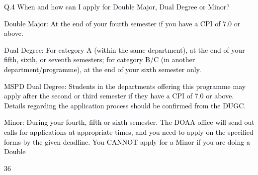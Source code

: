 \documentclass[12pt]{article}
\begin{document}
\vspace{\baselineskip}
{\fontsize{10pt}{12.0pt}\selectfont \textcolor[HTML]{00000A}{Q.4 When and how can I apply for Double Major, Dual Degree or Minor?}\par}\par


\vspace{\baselineskip}
{\fontsize{10pt}{12.0pt}\selectfont \textcolor[HTML]{00000A}{Double Major: At the end of your fourth semester if you have a CPI of 7.0 or above.}\par}\par


\vspace{\baselineskip}
\begin{justify}
{\fontsize{10pt}{12.0pt}\selectfont \textcolor[HTML]{00000A}{Dual Degree: For category A (within the same department), at the end of your fifth, sixth, or seventh semesters; for category B/C (in another department/programme), at the end of your sixth semester only.}\par}
\end{justify}\par


\vspace{\baselineskip}
\begin{justify}
{\fontsize{9pt}{10.8pt}\selectfont \textcolor[HTML]{00000A}{MSPD Dual Degree: Students in the departments offering this programme may apply after the second or third semester if they have a CPI of 7.0 or above. Details regarding the application process should be confirmed from the DUGC.}\par}
\end{justify}\par


\vspace{\baselineskip}
\begin{justify}
{\fontsize{9pt}{10.8pt}\selectfont \textcolor[HTML]{00000A}{Minor: During your fourth, fifth or sixth semester. The DOAA office will send out calls for applications at appropriate times, and you need to apply on the specified forms by the given deadline. You CANNOT apply for a Minor if you are doing a Double}\par}
\end{justify}\par

\begin{Center}
\textcolor[HTML]{00000A}{36}
\end{Center}\par
\end{document}
